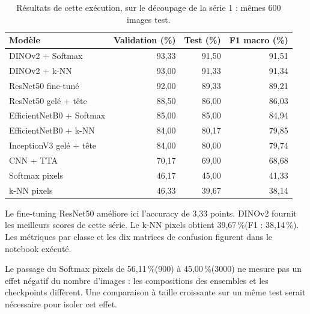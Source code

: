 \documentclass[10pt,a4paper]{article}
\newcommand{\pct}{\,\%\xspace}
\begin{document}
\begin{table}[H]\centering\small
\caption{Résultats de cette exécution, sur le découpage de la série 1 : mêmes 600 images test.}
\begin{tabular}{lrrr}\toprule
Modèle & Validation (\%) & Test (\%) & F1 macro (\%)\\\midrule
DINOv2 + Softmax & 93,33 & 91,50 & 91,51\\
DINOv2 + k-NN & 93,00 & 91,33 & 91,34\\
ResNet50 fine-tuné & 92,00 & 89,33 & 89,21\\
ResNet50 gelé + tête & 88,50 & 86,00 & 86,03\\
EfficientNetB0 + Softmax & 85,00 & 85,00 & 84,94\\
EfficientNetB0 + k-NN & 84,00 & 80,17 & 79,85\\
InceptionV3 gelé + tête & 84,00 & 80,00 & 79,74\\
CNN + TTA & 70,17 & 69,00 & 68,68\\
Softmax pixels & 46,17 & 45,00 & 41,33\\
k-NN pixels & 46,33 & 39,67 & 38,14\\\bottomrule\end{tabular}\end{table}
Le fine-tuning ResNet50 améliore ici l'accuracy de 3,33 points. DINOv2 fournit les meilleurs
scores de cette série. Le k-NN pixels obtient 39,67\pct (F1 : 38,14\pct).
Les métriques par classe et les dix matrices de confusion figurent dans le notebook exécuté.

Le passage du Softmax pixels de 56,11\pct (900) à 45,00\pct (3000) ne mesure pas un effet
négatif du nombre d'images : les compositions des ensembles et les checkpoints diffèrent.
Une comparaison à taille croissante sur un même test serait nécessaire pour isoler cet effet.
\end{document}
